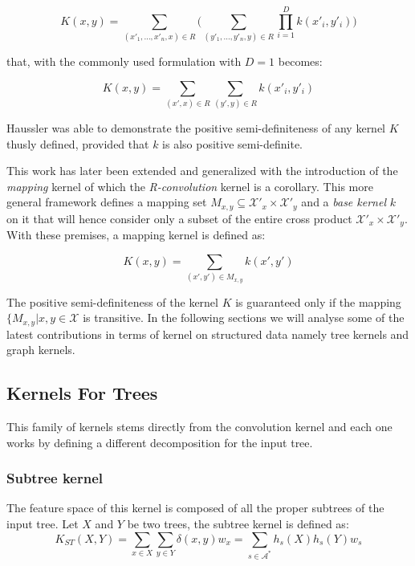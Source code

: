 \begin{equation}
    K(x,y) = \sum_{(x'_1,\dots,x'_n,x) \in R} \Bigg(\sum_{(y'_1,\dots,y'_n,y) \in R}
    \prod_{i=1}^D k(x'_i,y'_i)\Bigg)
\end{equation}

that, with the commonly used formulation with $D=1$ becomes:

\begin{equation}
    K(x,y) = \sum_{(x',x) \in R} \sum_{(y',y) \in R} k(x'_i,y'_i)
\end{equation}

Haussler was able to demonstrate the positive semi-definiteness of any kernel $K$
thusly defined, provided that $k$ is also positive semi-definite.

This work has later been extended and generalized \cite{Shin2010} with the introduction
of the \emph{mapping} kernel of which the \emph{R-convolution} kernel is a corollary.
This more general framework defines a mapping set
$M_{x,y} \subseteq \mathcal{X'_\mathit{x}} \times \mathcal{X'_\mathit{y}}$ and a \emph{base kernel} $k$ on it
that will hence consider only a subset of the entire cross product $\mathcal{X'_\mathit{x}} \times \mathcal{X'_\mathit{y}}$.
With these premises, a mapping kernel is defined as:
    
\begin{equation}
    K(x,y) = \sum_{(x',y') \in M_{x,y}} k(x',y')
\end{equation}

The positive semi-definiteness of the kernel $K$ is guaranteed only if the
mapping $\{M_{x,y}|x,y \in \mathcal{X}$ is transitive.
In the following sections we will analyse some of the latest contributions in terms
of kernel on structured data namely tree kernels and graph kernels.

\subsection{Kernels For Trees}
This family of kernels stems directly from the convolution kernel and each one
works by defining a different decomposition for the input tree.

\subsubsection{Subtree kernel}
The feature space of this kernel is composed of all the proper subtrees of the
input tree.
Let $X$ and $Y$ be two trees, the  subtree kernel is defined as:
\begin{equation}
    K_{ST}(X,Y) = \sum_{x \in X} \sum_{y \in Y} \delta(x,y)w_x =
    \sum_{s \in \mathcal{A}^*} h_s(X)h_s(Y)w_s
\end{equation}

